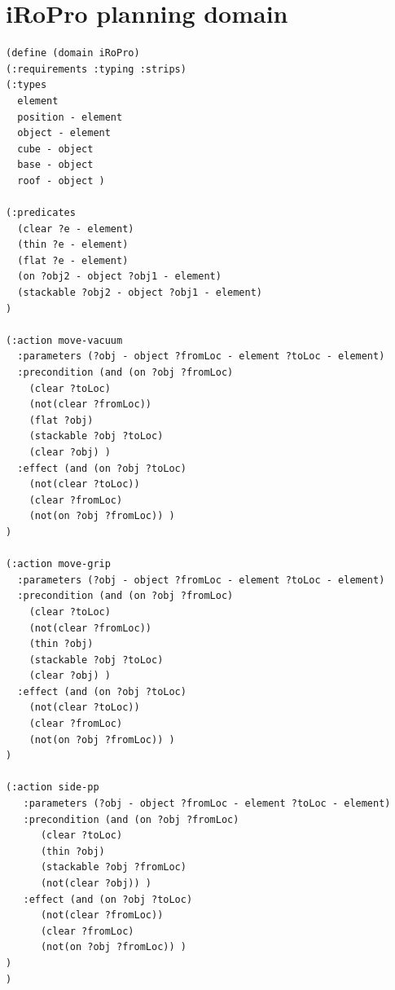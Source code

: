 \section{iRoPro planning domain}
\begin{verbatim}
(define (domain iRoPro)
(:requirements :typing :strips)
(:types 
  element 
  position - element 
  object - element 
  cube - object 
  base - object 
  roof - object )

(:predicates
  (clear ?e - element)
  (thin ?e - element)
  (flat ?e - element)
  (on ?obj2 - object ?obj1 - element)
  (stackable ?obj2 - object ?obj1 - element) 
)

(:action move-vacuum
  :parameters (?obj - object ?fromLoc - element ?toLoc - element)
  :precondition (and (on ?obj ?fromLoc)
    (clear ?toLoc)
    (not(clear ?fromLoc))
    (flat ?obj)
    (stackable ?obj ?toLoc)
    (clear ?obj) )
  :effect (and (on ?obj ?toLoc)
    (not(clear ?toLoc))
    (clear ?fromLoc)
    (not(on ?obj ?fromLoc)) )
)

(:action move-grip
  :parameters (?obj - object ?fromLoc - element ?toLoc - element)
  :precondition (and (on ?obj ?fromLoc)
    (clear ?toLoc)
    (not(clear ?fromLoc))
    (thin ?obj)
    (stackable ?obj ?toLoc)
    (clear ?obj) )
  :effect (and (on ?obj ?toLoc)
    (not(clear ?toLoc))
    (clear ?fromLoc)
    (not(on ?obj ?fromLoc)) )
)

(:action side-pp
   :parameters (?obj - object ?fromLoc - element ?toLoc - element)
   :precondition (and (on ?obj ?fromLoc)
      (clear ?toLoc)
      (thin ?obj)
      (stackable ?obj ?fromLoc)
      (not(clear ?obj)) )
   :effect (and (on ?obj ?toLoc)
      (not(clear ?fromLoc))
      (clear ?fromLoc)
      (not(on ?obj ?fromLoc)) )
)
)
\end{verbatim}

